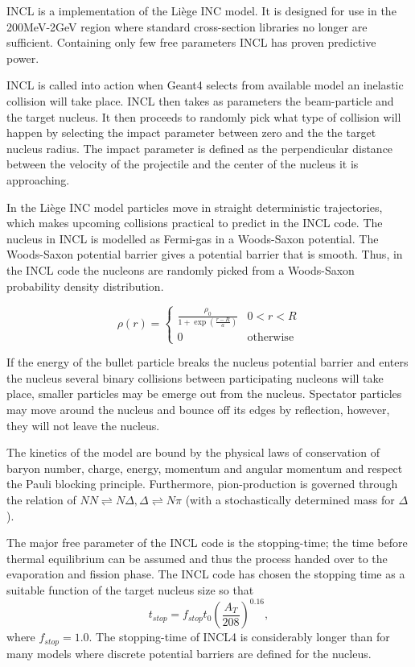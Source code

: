 INCL is a implementation of the Liège INC model. It is designed for use in the 200MeV-2GeV region where standard cross-section libraries no longer are sufficient. Containing only few free parameters INCL has proven predictive power.

INCL is called into action when Geant4 selects from available model an inelastic collision will take place. INCL then takes as parameters the beam-particle and the target nucleus. It then proceeds to randomly pick what type of collision will happen by selecting the impact parameter between zero and the the target nucleus radius. The impact parameter is defined as the perpendicular distance between the velocity of the projectile and the center of the nucleus it is approaching.

In the Liège INC model particles move in straight deterministic trajectories, which makes upcoming collisions practical to predict in the INCL code.
 The nucleus in INCL is modelled as Fermi-gas in a Woods-Saxon potential. %
 The Woods-Saxon potential barrier gives a potential barrier that is smooth. Thus, in the INCL code the nucleons are randomly picked from a Woods-Saxon probability density distribution.

\begin{equation}
\rho(r) = \begin{cases}
\frac{\rho_{0}}{1+\exp({\frac{r-R}{a}})} & 0 < r < R \\
0 & \text{otherwise}
\end{cases}
\label{WoodsSaxonINCL}
\end{equation}

If the energy of the bullet particle breaks the nucleus potential barrier and enters the nucleus several binary collisions between participating nucleons will take place, smaller particles may be emerge out from the nucleus. Spectator particles may move around the nucleus and bounce off its edges by reflection, however, they will not leave the nucleus.

The kinetics of the model are bound by the physical laws of conservation of baryon number, charge, energy, momentum and angular momentum and respect the Pauli blocking principle. Furthermore, pion-production is governed through the relation of $NN \rightleftharpoons N \Delta, \Delta \rightleftharpoons N\pi$ (with a stochastically determined mass for $\Delta$).

The major free parameter of the INCL code is the stopping-time; the time before thermal equilibrium can be assumed and thus the process handed over to the evaporation and fission phase. The INCL code has chosen the stopping time as a suitable function of the target nucleus size so that $$t_{stop} = f_{stop}t_{0}(\frac{A_T}{208})^{0.16},$$ where $f_{stop} = 1.0$. The stopping-time of INCL4 is considerably longer than for many models where discrete potential barriers are defined for the nucleus.


